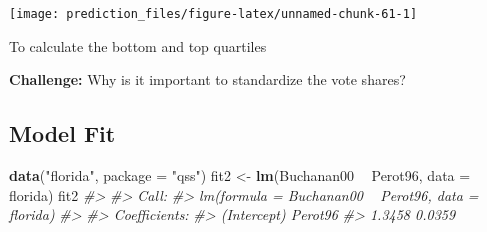 \documentclass[]{book}
\newenvironment{Shaded}{\begin{snugshade}}{\end{snugshade}}
\newcommand{\KeywordTok}[1]{\textcolor[rgb]{0.13,0.29,0.53}{\textbf{#1}}}
\newcommand{\DataTypeTok}[1]{\textcolor[rgb]{0.13,0.29,0.53}{#1}}
\newcommand{\FloatTok}[1]{\textcolor[rgb]{0.00,0.00,0.81}{#1}}
\newcommand{\StringTok}[1]{\textcolor[rgb]{0.31,0.60,0.02}{#1}}
\newcommand{\CommentTok}[1]{\textcolor[rgb]{0.56,0.35,0.01}{\textit{#1}}}
\newcommand{\OperatorTok}[1]{\textcolor[rgb]{0.81,0.36,0.00}{\textbf{#1}}}
\newcommand{\NormalTok}[1]{#1}
\theoremstyle{definition}
\theoremstyle{definition}
\theoremstyle{definition}
\theoremstyle{remark}
\begin{document}
\begin{center}\texttt{[image: prediction\_files/figure-latex/unnamed-chunk-61-1]} \end{center}

To calculate the bottom and top quartiles

\begin{Shaded}
\end{Shaded}

\textbf{Challenge:} Why is it important to standardize the vote shares?

\subsection{Model Fit}\label{model-fit}

\begin{Shaded}
\begin{Highlighting}[]
\KeywordTok{data}\NormalTok{(}\StringTok{"florida"}\NormalTok{, }\DataTypeTok{package =} \StringTok{"qss"}\NormalTok{)}
\NormalTok{fit2 <-}\StringTok{ }\KeywordTok{lm}\NormalTok{(Buchanan00 }\OperatorTok{~}\StringTok{ }\NormalTok{Perot96, }\DataTypeTok{data =}\NormalTok{ florida)}
\NormalTok{fit2}
\CommentTok{#> }
\CommentTok{#> Call:}
\CommentTok{#> lm(formula = Buchanan00 ~ Perot96, data = florida)}
\CommentTok{#> }
\CommentTok{#> Coefficients:}
\CommentTok{#> (Intercept)      Perot96  }
\CommentTok{#>      1.3458       0.0359}
\end{Highlighting}
\end{Shaded}
\end{document}
